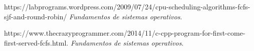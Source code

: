 \documentclass[a4paperx]{article}
\begin{document}
\begin{thebibliography}{99}

 https://labprograms.wordpress.com/2009/07/24/cpu-scheduling-algorithms-fcfs-sjf-and-round-robin/ {\it Fundamentos de sistemas operativos}. 

  https://www.thecrazyprogrammer.com/2014/11/c-cpp-program-for-first-come-first-served-fcfs.html. {\it Fundamentos de sistemas operativos}. 

\end{thebibliography}
\end{document}
